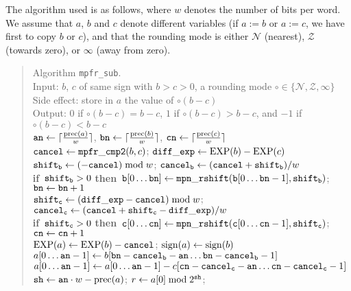 \documentclass[12pt]{amsart}
\def\Exp{{\rm EXP}}
\def\prec{{\rm prec}}
\def\sign{{\rm sign}}
\def\Z{{\mathcal Z}}
\def\N{{\mathcal N}}
\def\If{{\bf if}}
\def\then{{\bf then}}
\begin{document}
The algorithm used is as follows, where $w$ denotes the number of bits
per word. We assume that $a$, $b$ and $c$ denote different variables
(if $a:=b$ or $a:=c$, we have first to copy $b$ or $c$), and
that the rounding mode is either $\N$ (nearest),
$\Z$ (towards zero), or $\infty$ (away from zero).
\begin{quote}
Algorithm {\tt mpfr\_sub}. \\
Input: $b$, $c$ of same sign with $b > c > 0$, a rounding mode
$\circ \in \{ \N, \Z, \infty \}$ \\
Side effect: store in $a$ the value of $\circ(b - c)$ \\
Output: $0$ if $\circ(b - c) = b-c$, $1$ if $\circ(b - c) > b-c$,
        and $-1$ if $\circ(b - c) < b-c$ \\
${\tt an} \leftarrow \lceil \frac{\prec(a)}{w} \rceil$,
${\tt bn} \leftarrow \lceil \frac{\prec(b)}{w} \rceil$,
${\tt cn} \leftarrow \lceil \frac{\prec(c)}{w} \rceil$ \\
${\tt cancel} \leftarrow {\tt mpfr\_cmp2}(b, c)$; \quad
        ${\tt diff\_exp} \leftarrow \Exp(b)-\Exp(c)$ \\
${\tt shift_b} \leftarrow (-{\tt cancel}) \bmod w$; \quad
        ${\tt cancel_b} \leftarrow ({\tt cancel} + {\tt shift_b})/w$ \\
\If\ ${\tt shift_b} > 0$ \then\
        ${\tt b}[0 \dots \mbox{\tt bn}] \leftarrow
        {\tt mpn\_rshift}({\tt b}[0 \dots {\tt bn}-1], {\tt shift_b})$;
        ${\tt bn} \leftarrow {\tt bn} + 1$ \\
${\tt shift_c} \leftarrow ({\tt diff\_exp}-{\tt cancel}) \bmod w$; \quad
${\tt cancel_c} \leftarrow ({\tt cancel} + {\tt shift_c}-{\tt diff\_exp})/w$ \\
\If\ ${\tt shift_c} > 0$ \then\
        ${\tt c}[0 \dots \mbox{\tt cn}] \leftarrow
        {\tt mpn\_rshift}({\tt c}[0 \dots {\tt cn}-1], {\tt shift_c})$;
        ${\tt cn} \leftarrow {\tt cn} + 1$ \\
$\Exp(a) \leftarrow \Exp(b) - {\tt cancel}$; \quad
        $\sign(a) \leftarrow \sign(b)$ \\
$a[0 \dots {\tt an}-1] \leftarrow b[{\tt bn} - {\tt cancel_b} - {\tt an}
        \dots {\tt bn} - {\tt cancel_b} - 1]$ \\
$a[0 \dots {\tt an}-1] \leftarrow a[0 \dots {\tt an}-1] - c[{\tt cn} -
        {\tt cancel_c} - {\tt an} \dots {\tt cn} - {\tt cancel_c} - 1]$ \\
${\tt sh} \leftarrow {\tt an} \cdot w - \prec(a)$; \quad
        $r \leftarrow a[0] \bmod 2^{\tt sh}$; \quad

\end{quote}
\end{document}
